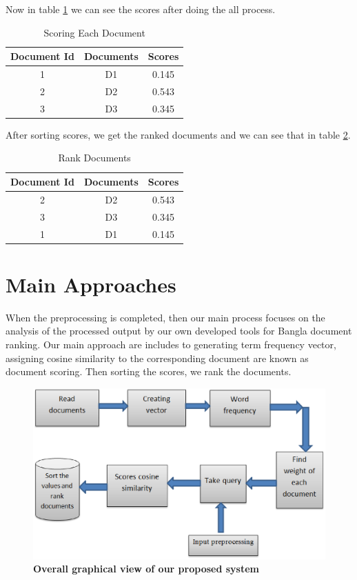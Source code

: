 Now in table \ref{tab:Scoring} we can see the scores after doing the all process.

\begin{table}[htp]	
\centering

\caption{Scoring Each Document  }
\vspace{0.5cm}
\begin{tabular}{|c|c|c|} 
\hline

	Document Id & Documents & Scores \\ \hline
 1 & D1 &	0.145   \\ \hline
 2 & D2 & 0.543   \\ \hline
 3 & D3  &0.345   \\ \hline


\end{tabular}
\label{tab:Scoring}
\end{table}

After sorting scores, we get the ranked documents and we can see that in table \ref{tab:Rank}.


\begin{table}[htp]	
\centering
\caption{Rank Documents  }
\vspace{0.5cm}
\begin{tabular}{|c|c|c|} 
\hline

Document Id & Documents & Scores \\ \hline
 2 & D2 &	0.543   \\ \hline
 3 & D3 & 0.345   \\ \hline
 1 & D1 &0.145  \\ \hline


\end{tabular}
\label{tab:Rank}
\end{table}


\section{Main Approaches}

When the preprocessing is completed, then our main process focuses on the analysis of the processed output by our own developed tools for Bangla document ranking. Our main approach are includes to generating term frequency vector, assigning cosine similarity to the corresponding document are known as document scoring. Then sorting the scores, we rank the documents.

\begin{figure}[htp]
	\centering
		\includegraphics[width=.65\textwidth]{figure/five.eps}
	\caption{\textbf{Overall graphical view of our proposed system}}
	\label{Figure:graphical}
\end{figure}

